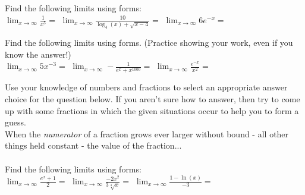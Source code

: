 \documentclass[10pt]{article}
\begin{document}
\newpage

 Find the following limits using forms:\\

$\displaystyle\lim_{x\to\infty} \frac{1}{x^5}=$ 
\hfill 
$\displaystyle\lim_{x\to\infty} \frac{10}{\log_4(x)+\sqrt{x-4}}=$ 
\hfill $\displaystyle\lim_{x\to\infty} 6e^{-x}=$ 
\hfill

\vfill

 Find the following limits using forms. (Practice showing your work, even if you know the answer!)\\

$\displaystyle\lim_{x\to\infty} 5x^{-3}=$ 
\hfill 
$\displaystyle\lim_{x\to\infty} -\frac{1}{e^x+x^{1000}}=$ 
\hfill $\displaystyle\lim_{x\to\infty} \frac{e^{-x}}{x^2} =$ 
\hfill
\vfill


\lform  {}


 Use your knowledge of numbers and fractions to select an appropriate answer choice for the question below. If you aren't sure how to answer, then try to come up with some fractions in which the given situations occur to help you to form a guess.\\

When the {\it numerator} of a fraction grows ever larger without bound - all other things held constant - the value of the fraction...\\
\\ 
 Find the following limits using forms:\\

$\displaystyle\lim_{x\to\infty} \frac{e^x+1}{2}=$ 
\hfill 
$\displaystyle\lim_{x\to\infty} \frac{-2x^2}{3\sqrt[4]{x}}=$ 
\hfill 
$\displaystyle\lim_{x\to\infty} \frac{1-\ln(x)}{-3}=$  
\hfill
\end{document}
